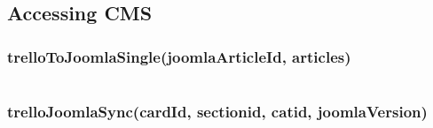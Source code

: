 \subsection{Accessing CMS}

\subsubsection{trelloToJoomlaSingle(joomlaArticleId, articles)}
\begin{lstlisting}[aboveskip=1\baselineskip, caption= trelloToJoomlaSingle(), label=listing061]

\end{lstlisting}

\subsubsection{trelloJoomlaSync(cardId, sectionid, catid, joomlaVersion)}
\begin{lstlisting}[aboveskip=1\baselineskip, caption= trelloJoomlaSync(), label=listing062]

\end{lstlisting}